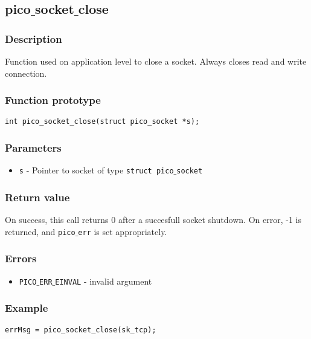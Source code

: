 \subsection{pico$\_$socket$\_$close}

\subsubsection*{Description}
Function used on application level to close a socket. Always closes read and write connection.

\subsubsection*{Function prototype}
\begin{verbatim}
int pico_socket_close(struct pico_socket *s);
\end{verbatim}

\subsubsection*{Parameters}
\begin{itemize}[noitemsep]
\item \texttt{s} - Pointer to socket of type \texttt{struct pico$\_$socket}
\end{itemize}

\subsubsection*{Return value}
On success, this call returns 0 after a succesfull socket shutdown.
On error, -1 is returned, and \texttt{pico$\_$err} is set appropriately.

\subsubsection*{Errors}
\begin{itemize}[noitemsep]
\item \texttt{PICO$\_$ERR$\_$EINVAL} - invalid argument
\end{itemize}

\subsubsection*{Example}
\begin{verbatim}
errMsg = pico_socket_close(sk_tcp);
\end{verbatim}



